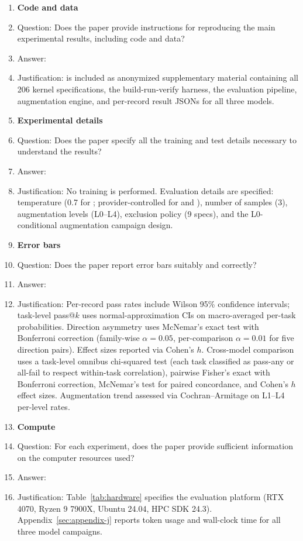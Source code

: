 {\begin{enumerate}
\item {\bf Code and data}
    \item[] Question: Does the paper provide instructions for reproducing the main experimental results, including code and data?
    \item[] Answer: \answerYes{}
    \item[] Justification: \parbench{} is included as anonymized supplementary material containing all 206 kernel specifications, the build-run-verify harness, the evaluation pipeline, augmentation engine, and per-record result JSONs for all three models.

\item {\bf Experimental details}
    \item[] Question: Does the paper specify all the training and test details necessary to understand the results?
    \item[] Answer: \answerYes{}
    \item[] Justification: No training is performed. Evaluation details are specified: temperature (0.7 for \qwenshort{}; provider-controlled for \gptnew{} and \codex{}), number of samples (3), augmentation levels (L0--L4), \knownfail{} exclusion policy (9 specs), and the L0-conditional augmentation campaign design.

\item {\bf Error bars}
    \item[] Question: Does the paper report error bars suitably and correctly?
    \item[] Answer: \answerYes{}
    \item[] Justification: Per-record pass rates include Wilson 95\% confidence intervals; task-level pass@$k$ uses normal-approximation CIs on macro-averaged per-task probabilities. Direction asymmetry uses McNemar's exact test with Bonferroni correction (family-wise $\alpha=0.05$, per-comparison $\alpha=0.01$ for five direction pairs). Effect sizes reported via Cohen's $h$. Cross-model comparison uses a task-level omnibus chi-squared test (each task classified as pass-any or all-fail to respect within-task correlation), pairwise Fisher's exact with Bonferroni correction, McNemar's test for paired concordance, and Cohen's $h$ effect sizes. Augmentation trend assessed via Cochran--Armitage on L1--L4 per-level rates.

\item {\bf Compute}
    \item[] Question: For each experiment, does the paper provide sufficient information on the computer resources used?
    \item[] Answer: \answerYes{}
    \item[] Justification: Table~\ref{tab:hardware} specifies the evaluation platform (RTX 4070, Ryzen 9 7900X, Ubuntu 24.04, HPC SDK 24.3). Appendix~\ref{sec:appendix-j} reports token usage and wall-clock time for all three model campaigns.


\end{enumerate}}
